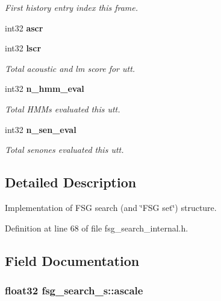 \begin{DoxyCompactItemize}
\begin{DoxyCompactList}\small\item\em First history entry index this frame. \end{DoxyCompactList}\item 
int32 {\bfseries ascr}\label{structfsg__search__s_aac3c130a5777edd2a227fd064eaefbf2}

\item 
int32 {\bf lscr}\label{structfsg__search__s_a709277a80e9418ecc3e63296f8eb6bbf}

\begin{DoxyCompactList}\small\item\em Total acoustic and lm score for utt. \end{DoxyCompactList}\item 
int32 {\bf n\-\_\-hmm\-\_\-eval}\label{structfsg__search__s_a7e3d7375b4a33af339e8b55885677faa}

\begin{DoxyCompactList}\small\item\em Total H\-M\-Ms evaluated this utt. \end{DoxyCompactList}\item 
int32 {\bf n\-\_\-sen\-\_\-eval}\label{structfsg__search__s_a56494e3b30d0c66367c7ef055b8addb2}

\begin{DoxyCompactList}\small\item\em Total senones evaluated this utt. \end{DoxyCompactList}\end{DoxyCompactItemize}


\subsection{Detailed Description}
Implementation of F\-S\-G search (and \char`\"{}\-F\-S\-G set\char`\"{}) structure. 

Definition at line 68 of file fsg\-\_\-search\-\_\-internal.\-h.



\subsection{Field Documentation}
\subsubsection[{ascale}]{\setlength{\rightskip}{0pt plus 5cm}float32 fsg\-\_\-search\-\_\-s\-::ascale}\label{structfsg__search__s_a4d13fff2e14882b0125386fc27a4097f}


